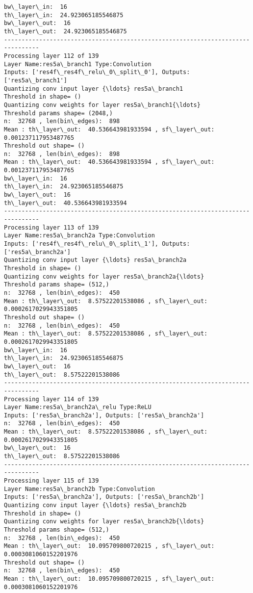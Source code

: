 \documentclass[11pt]{article}
\begin{document}
\begin{Verbatim}[commandchars=\\\{\}]
bw\_layer\_in:  16
th\_layer\_in:  24.923065185546875
bw\_layer\_out:  16
th\_layer\_out:  24.923065185546875
--------------------------------------------------------------------------------
Processing layer 112 of 139
Layer Name:res5a\_branch1 Type:Convolution
Inputs: ['res4f\_res4f\_relu\_0\_split\_0'], Outputs: ['res5a\_branch1']
Quantizing conv input layer {\ldots} res5a\_branch1
Threshold in shape= ()
Quantizing conv weights for layer res5a\_branch1{\ldots}
Threshold params shape= (2048,)
n:  32768 , len(bin\_edges):  898
Mean : th\_layer\_out:  40.536643981933594 , sf\_layer\_out:  0.001237117953487765
Threshold out shape= ()
n:  32768 , len(bin\_edges):  898
Mean : th\_layer\_out:  40.536643981933594 , sf\_layer\_out:  0.001237117953487765
bw\_layer\_in:  16
th\_layer\_in:  24.923065185546875
bw\_layer\_out:  16
th\_layer\_out:  40.536643981933594
--------------------------------------------------------------------------------
Processing layer 113 of 139
Layer Name:res5a\_branch2a Type:Convolution
Inputs: ['res4f\_res4f\_relu\_0\_split\_1'], Outputs: ['res5a\_branch2a']
Quantizing conv input layer {\ldots} res5a\_branch2a
Threshold in shape= ()
Quantizing conv weights for layer res5a\_branch2a{\ldots}
Threshold params shape= (512,)
n:  32768 , len(bin\_edges):  450
Mean : th\_layer\_out:  8.57522201538086 , sf\_layer\_out:  0.0002617029943351805
Threshold out shape= ()
n:  32768 , len(bin\_edges):  450
Mean : th\_layer\_out:  8.57522201538086 , sf\_layer\_out:  0.0002617029943351805
bw\_layer\_in:  16
th\_layer\_in:  24.923065185546875
bw\_layer\_out:  16
th\_layer\_out:  8.57522201538086
--------------------------------------------------------------------------------
Processing layer 114 of 139
Layer Name:res5a\_branch2a\_relu Type:ReLU
Inputs: ['res5a\_branch2a'], Outputs: ['res5a\_branch2a']
n:  32768 , len(bin\_edges):  450
Mean : th\_layer\_out:  8.57522201538086 , sf\_layer\_out:  0.0002617029943351805
bw\_layer\_out:  16
th\_layer\_out:  8.57522201538086
--------------------------------------------------------------------------------
Processing layer 115 of 139
Layer Name:res5a\_branch2b Type:Convolution
Inputs: ['res5a\_branch2a'], Outputs: ['res5a\_branch2b']
Quantizing conv input layer {\ldots} res5a\_branch2b
Threshold in shape= ()
Quantizing conv weights for layer res5a\_branch2b{\ldots}
Threshold params shape= (512,)
n:  32768 , len(bin\_edges):  450
Mean : th\_layer\_out:  10.095709800720215 , sf\_layer\_out:  0.0003081060152201976
Threshold out shape= ()
n:  32768 , len(bin\_edges):  450
Mean : th\_layer\_out:  10.095709800720215 , sf\_layer\_out:  0.0003081060152201976

\end{Verbatim}
\end{document}
